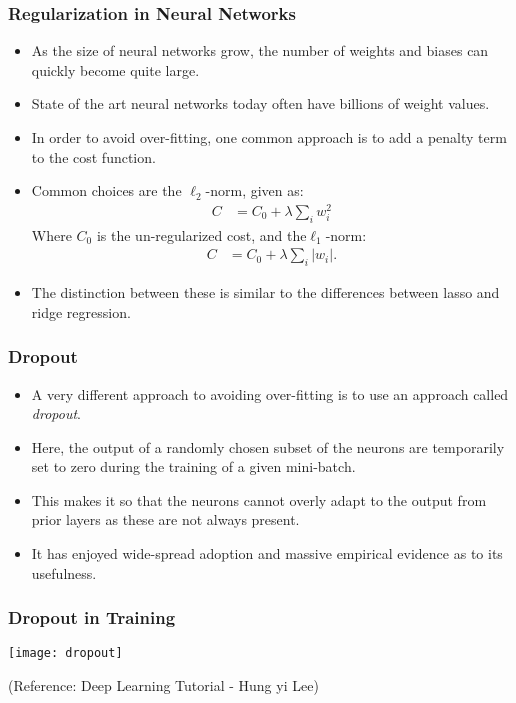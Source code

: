 \begin{frame}[fragile] \frametitle{Regularization in Neural Networks}

\begin{itemize}
\item As the size of neural networks grow, the number of weights and biases can
quickly become quite large. 
\item State of the art neural networks today often
have billions of weight values. 
\item In order to avoid over-fitting, one common
approach is to add a penalty term to the cost function. 
\item Common choices are
the $\ell_2$-norm, given as:
\begin{align*}
C &= C_0 + \lambda \sum_i w_i^2
\end{align*}
Where $C_0$ is the un-regularized cost, and the$\ell_1$-norm:
\begin{align*}
C &= C_0 + \lambda \sum_i |w_i|.
\end{align*}
\item The distinction between these is similar to the differences between lasso and
ridge regression.
\end{itemize}
\end{frame}

\begin{frame}[fragile] \frametitle{Dropout}
\begin{itemize}
\item A very different approach to avoiding over-fitting is to use an approach called
\textit{dropout}. 
\item Here, the output of a randomly chosen subset of the neurons
are temporarily set to zero during the training of a given mini-batch. 
\item This makes
it so that the neurons cannot overly adapt to the output from prior layers as
these are not always present. 
\item It has enjoyed wide-spread adoption and massive
empirical evidence as to its usefulness.
\end{itemize}
\end{frame}


\begin{frame}[fragile] \frametitle{Dropout in Training}

\begin{center}
\texttt{[image: dropout]}
\end{center}
\tiny{(Reference:  Deep Learning Tutorial - Hung yi Lee)}
\end{frame}


